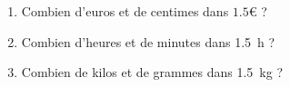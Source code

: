 
\begin{mental}
    \begin{enumerate}
        \item
            Combien d'euros et de centimes dans \( 1.5\)€ ?
        \item
            Combien d'heures et de minutes dans \SI{1.5}{\hour} ?
        \item
            Combien de kilos et de grammes dans \SI{1.5}{\kilo\gram} ?
    \end{enumerate}
\end{mental}
